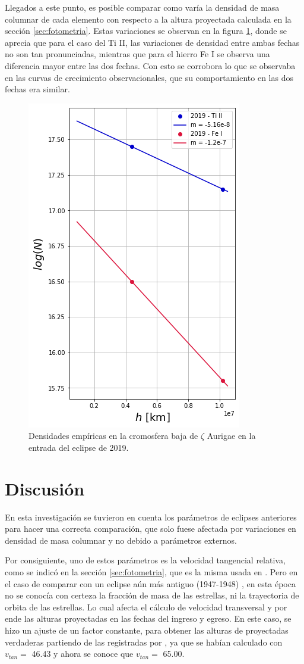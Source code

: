 \documentclass[12pt,oneside,openany,letter]{book}
\begin{document}
Llegados a este punto, es posible comparar como varía la densidad de masa columnar de cada elemento con respecto a la altura proyectada calculada en la sección \ref{sec:fotometria}. Estas variaciones se observan en la figura \ref{fig:dens_alt1}, donde se aprecia que para el caso del Ti II, las variaciones de densidad entre ambas fechas no son tan pronunciadas, mientras que para el hierro Fe I se observa una diferencia mayor entre las dos fechas. Con esto se corrobora lo que se observaba en las curvas de crecimiento observacionales, que su comportamiento en las dos fechas era similar.

\begin{figure}[h]
    \centering
    \includegraphics[width=0.5\linewidth]{Gaficas/altura_dens_.png}
    \caption{Densidades empíricas en la cromosfera baja de $\zeta$ Aurigae en la entrada del eclipse de 2019.}
    \label{fig:dens_alt1}
\end{figure}


\section{Discusión}\label{discusion}

En esta investigación se tuvieron en cuenta los parámetros de eclipses anteriores para hacer una correcta comparación, que solo fuese afectada por variaciones en densidad de masa columnar y no debido a parámetros externos. 

Por consiguiente, uno de estos parámetros es la velocidad tangencial relativa, como se indicó en la sección \ref{sec:fotometria}, que es la misma usada en \citet{kps1O}. Pero en el caso de comparar con un eclipse aún más antiguo (1947-1948) \citep{wilson1954chromospheric}, en esta época no se conocía con certeza la fracción de masa de las estrellas, ni la trayectoria de orbita de las estrellas. Lo cual afecta el cálculo de velocidad transversal y por ende las alturas proyectadas en las fechas del ingreso y egreso. En este caso, se hizo un ajuste de un factor constante, para  obtener las alturas de proyectadas verdaderas partiendo de las registradas por \citet{wilson1954chromospheric}, ya que se habían calculado con $v_{tan} =$ 46.43 y ahora se conoce que $v_{tan} =$ 65.00.
\end{document}
